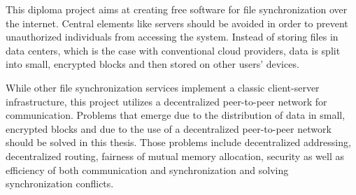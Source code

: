 This diploma project aims at creating free software for file synchronization over the internet.
Central elements like servers should be avoided in order to prevent unauthorized individuals from accessing the system.
Instead of storing files in data centers, which is the case with conventional cloud providers, data is split into small, encrypted blocks and then stored on other users' devices.

While other file synchronization services implement a classic client-server infrastructure, this project utilizes a decentralized peer-to-peer network for communication.
Problems that emerge due to the distribution of data in small, encrypted blocks and due to the use of a decentralized peer-to-peer network should be solved in this thesis.
Those problems include decentralized addressing, decentralized routing, fairness of mutual memory allocation, security as well as efficiency of both communication and synchronization and solving synchronization conflicts.

